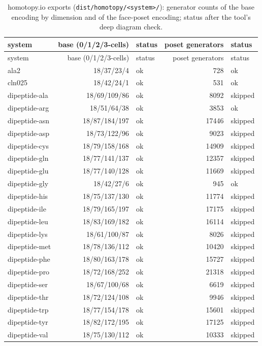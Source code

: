 \begin{small}\begin{longtable}{lrlrl}
\caption{homotopy.io exports (\texttt{dist/homotopy/<system>/}): generator counts of the base encoding by dimension and of the face-poset encoding; status after the tool's deep diagram check.}\label{tab:homotopy}\\
\toprule system & base (0/1/2/3-cells) & status & poset generators & status\\\midrule\endfirsthead
\toprule system & base (0/1/2/3-cells) & status & poset generators & status\\\midrule\endhead
ala2 & 18/37/23/4 & ok & 728 & ok\\
cln025 & 18/42/24/1 & ok & 531 & ok\\
dipeptide-ala & 18/69/109/86 & ok & 8092 & skipped\\
dipeptide-arg & 18/51/64/38 & ok & 3853 & ok\\
dipeptide-asn & 18/87/184/197 & ok & 17446 & skipped\\
dipeptide-asp & 18/73/122/96 & ok & 9023 & skipped\\
dipeptide-cys & 18/79/158/168 & ok & 14909 & skipped\\
dipeptide-gln & 18/77/141/137 & ok & 12357 & skipped\\
dipeptide-glu & 18/77/140/128 & ok & 11669 & skipped\\
dipeptide-gly & 18/42/27/6 & ok & 945 & ok\\
dipeptide-his & 18/75/137/130 & ok & 11774 & skipped\\
dipeptide-ile & 18/79/165/197 & ok & 17175 & skipped\\
dipeptide-leu & 18/83/169/182 & ok & 16114 & skipped\\
dipeptide-lys & 18/61/100/87 & ok & 8026 & skipped\\
dipeptide-met & 18/78/136/112 & ok & 10420 & skipped\\
dipeptide-phe & 18/80/163/178 & ok & 15727 & skipped\\
dipeptide-pro & 18/72/168/252 & ok & 21318 & skipped\\
dipeptide-ser & 18/67/100/68 & ok & 6619 & skipped\\
dipeptide-thr & 18/72/124/108 & ok & 9946 & skipped\\
dipeptide-trp & 18/77/154/178 & ok & 15601 & skipped\\
dipeptide-tyr & 18/82/172/195 & ok & 17125 & skipped\\
dipeptide-val & 18/75/130/112 & ok & 10333 & skipped\\

\end{longtable}
\end{small}
